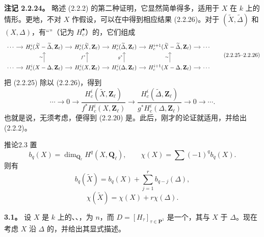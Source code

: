\textbf{注记 2.2.24。} 略述 (2.2.2) 的第二种证明，它显然简单得多，适用于 $X$ 在 $k$ 上的情形。更地，不对 $X$ 作假设，可以在中得到相应结果 (2.2.26)。对于 $(\widetilde X,\widetilde\Delta)$ 和 $(X,\Delta)$，有“”（记为 $H_c^\bullet$）的，它们组成
\[
\begin{tikzcd}[column sep=small]
\cdots\arrow[r]&H_c^i(\widetilde X-\widetilde\Delta,\mathbf Z_\ell)\arrow[r]&H_c^i(\widetilde X,\mathbf Z_\ell)\arrow[r]&H_c^i(\widetilde\Delta,\mathbf Z_\ell)\arrow[r]&H_c^{i+1}(\widetilde X-\widetilde\Delta,\mathbf Z_\ell)\arrow[r]&\cdots\\
\cdots\arrow[r]&H_c^i(X-\Delta,\mathbf Z_\ell)\arrow[u,"\sim"]\arrow[r]&H_c^i(X,\mathbf Z_\ell)\arrow[u,"f^*"]\arrow[r]&H_c^i(\Delta,\mathbf Z_\ell)\arrow[u,"g^*"]\arrow[r]&H_c^{i+1}(X-\Delta,\mathbf Z_\ell)\arrow[u,"\sim"]\arrow[r]&\cdots
\end{tikzcd}\tag{2.2.25--2.2.26}
\]
把 (2.2.25) 除以 (2.2.26)，得到
\[
 \cdots\longrightarrow0\longrightarrow\frac{H_c^i(\widetilde X,\mathbf Z_\ell)}{f^*H_c^i(X,\mathbf Z_\ell)}\longrightarrow\frac{H_c^i(\widetilde\Delta,\mathbf Z_\ell)}{g^*H_c^i(\Delta,\mathbf Z_\ell)}\longrightarrow0\longrightarrow\cdots.\tag{2.2.27}
\]
也就是说，无须考虑，便得到 (2.2.20) 是。此后，刚才的论证就适用，并给出 (2.2.2)。

\begin{SGAresult}{推论}{2.3}
置
\[
 b_q(X)=\dim_{\mathbf Q_\ell}H^q(X,\mathbf Q_\ell),\qquad \chi(X)=\sum(-1)^qb_q(X).
\]
则有
\[
 b_q(\widetilde X)=b_q(X)+\sum_{j=1}^r b_{q-j}(\Delta),\tag{2.3.1}
\]
\[
 \chi(\widetilde X)=\chi(X)+r\chi(\Delta).\tag{2.3.2}
\]
\end{SGAresult}

\textbf{3.1。} 设 $X$ 是 $k$ 上的、、，为 $n$，而 $D=[H_\tau]_{\tau\in\mathbf P^1}$ 是一个，其与 $X$ 于 $\Delta$。现在考虑 $X$ 沿 $\Delta$ 的，并给出其显式描述。

